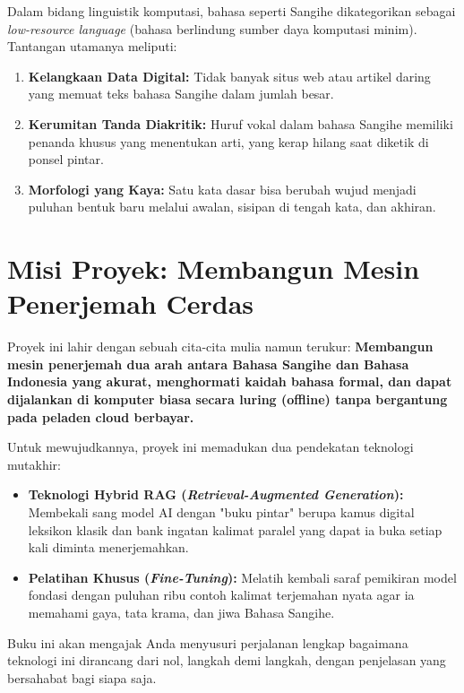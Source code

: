 Dalam bidang linguistik komputasi, bahasa seperti Sangihe dikategorikan sebagai \textit{low-resource language} (bahasa berlindung sumber daya komputasi minim). Tantangan utamanya meliputi:
\begin{enumerate}
    \item \textbf{Kelangkaan Data Digital:} Tidak banyak situs web atau artikel daring yang memuat teks bahasa Sangihe dalam jumlah besar.
    \item \textbf{Kerumitan Tanda Diakritik:} Huruf vokal dalam bahasa Sangihe memiliki penanda khusus yang menentukan arti, yang kerap hilang saat diketik di ponsel pintar.
    \item \textbf{Morfologi yang Kaya:} Satu kata dasar bisa berubah wujud menjadi puluhan bentuk baru melalui awalan, sisipan di tengah kata, dan akhiran.
\end{enumerate}

\section{Misi Proyek: Membangun Mesin Penerjemah Cerdas}
Proyek ini lahir dengan sebuah cita-cita mulia namun terukur: \textbf{Membangun mesin penerjemah dua arah antara Bahasa Sangihe dan Bahasa Indonesia yang akurat, menghormati kaidah bahasa formal, dan dapat dijalankan di komputer biasa secara luring (offline) tanpa bergantung pada peladen cloud berbayar.}

Untuk mewujudkannya, proyek ini memadukan dua pendekatan teknologi mutakhir:
\begin{itemize}
    \item \textbf{Teknologi Hybrid RAG (\textit{Retrieval-Augmented Generation}):} Membekali sang model AI dengan "buku pintar" berupa kamus digital leksikon klasik dan bank ingatan kalimat paralel yang dapat ia buka setiap kali diminta menerjemahkan.
    \item \textbf{Pelatihan Khusus (\textit{Fine-Tuning}):} Melatih kembali saraf pemikiran model fondasi \texttt{\StatBaseModel} dengan puluhan ribu contoh kalimat terjemahan nyata agar ia memahami gaya, tata krama, dan jiwa Bahasa Sangihe.
\end{itemize}

Buku ini akan mengajak Anda menyusuri perjalanan lengkap bagaimana teknologi ini dirancang dari nol, langkah demi langkah, dengan penjelasan yang bersahabat bagi siapa saja.
